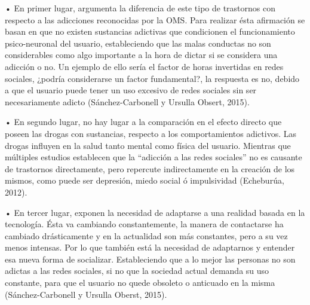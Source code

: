 \documentclass[oneside,11pt]{Latex/Classes/PhDthesisPSnPDF}
\begin{document}
• En primer lugar, argumenta la diferencia de este tipo de trastornos
con respecto a las adicciones reconocidas por la OMS. Para realizar ésta
afirmación se basan en que no existen sustancias adictivas que
condicionen el funcionamiento psico-neuronal del usuario, estableciendo
que las malas conductas no son considerables como algo importante a la
hora de dictar si se considera una adicción o no. Un ejemplo de ello
sería el factor de horas invertidas en redes sociales, ¿podría
considerarse un factor fundamental?, la respuesta es no, debido a que el
usuario puede tener un uso excesivo de redes sociales sin ser
necesariamente adicto (Sánchez-Carbonell y Ursulla Obsert, 2015).

• En segundo lugar, no hay lugar a la comparación en el efecto directo
que poseen las drogas con sustancias, respecto a los comportamientos
adictivos. Las drogas influyen en la salud tanto mental como física del
usuario. Mientras que múltiples estudios establecen que la ``adicción a
las redes sociales'' no es causante de trastornos directamente, pero
repercute indirectamente en la creación de los mismos, como puede ser
depresión, miedo social ó impulsividad (Echeburúa, 2012).

• En tercer lugar, exponen la necesidad de adaptarse a una realidad
basada en la tecnología. Ésta va cambiando constantemente, la manera de
contactarse ha cambiado drásticamente y en la actualidad son más
constantes, pero a su vez menos intensas. Por lo que también está la
necesidad de adaptarnos y entender esa nueva forma de socializar.
Estableciendo que a lo mejor las personas no son adictas a las redes
sociales, si no que la sociedad actual demanda su uso constante, para
que el usuario no quede obsoleto o anticuado en la misma
(Sánchez-Carbonell y Ursulla Oberst, 2015).
\end{document}
